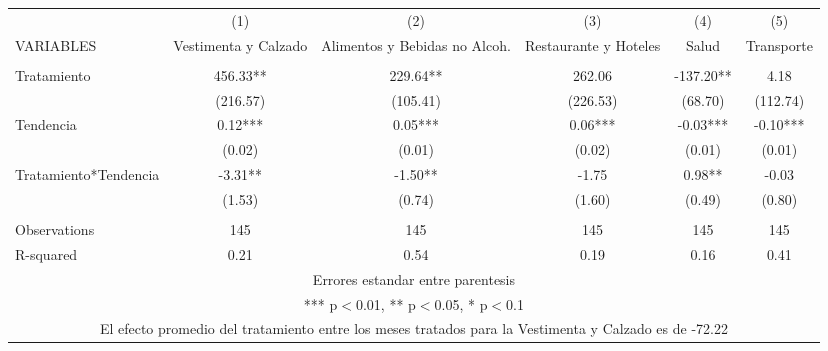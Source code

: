 \documentclass[]{article}
\begin{document}
\begin{tabular}{lccccc} \hline
 & (1) & (2) & (3) & (4) & (5) \\
VARIABLES & Vestimenta y Calzado & Alimentos y Bebidas no Alcoh. & Restaurante y Hoteles & Salud & Transporte \\ \hline
 &  &  &  &  &  \\
Tratamiento & 456.33** & 229.64** & 262.06 & -137.20** & 4.18 \\
 & (216.57) & (105.41) & (226.53) & (68.70) & (112.74) \\
Tendencia & 0.12*** & 0.05*** & 0.06*** & -0.03*** & -0.10*** \\
 & (0.02) & (0.01) & (0.02) & (0.01) & (0.01) \\
Tratamiento*Tendencia & -3.31** & -1.50** & -1.75 & 0.98** & -0.03 \\
 & (1.53) & (0.74) & (1.60) & (0.49) & (0.80) \\
 &  &  &  &  &  \\
Observations & 145 & 145 & 145 & 145 & 145 \\
 R-squared & 0.21 & 0.54 & 0.19 & 0.16 & 0.41 \\ \hline
\multicolumn{6}{c}{ Errores estandar entre parentesis} \\
\multicolumn{6}{c}{ *** p$<$0.01, ** p$<$0.05, * p$<$0.1} \\
\multicolumn{6}{c}{ El efecto promedio del tratamiento entre los meses tratados para la Vestimenta y Calzado es de -72.22} \\
\end{tabular}
\end{document}
